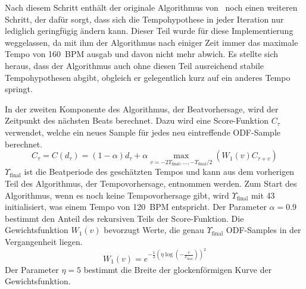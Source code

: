 {{{			%
			Nach diesem Schritt enthält der originale Algorithmus von~\cite{2009_DaPlSt} noch einen weiteren Schritt,
				der dafür sorgt,
				dass sich die Tempohypothese in jeder Iteration nur lediglich geringfügig ändern kann.
			Dieser Teil wurde für diese Implementierung weggelassen,
				da mit ihm der Algorithmus nach einiger Zeit immer das maximale Tempo von \SI{160}{\ac{BPM}} ausgab
				und davon nicht mehr abwich. 
			Es stellte sich heraus,
				dass der Algorithmus auch ohne diesen Teil ausreichend stabile Tempohypothesen abgibt,
				obgleich er gelegentlich kurz auf ein anderes Tempo springt.

			In der zweiten Komponente des Algorithmus,
				der Beatvorhersage,
				wird der Zeitpunkt des nächsten Beats berechnet.
			Dazu wird eine Score-Funktion $C_\tau$ verwendet,
				welche ein neues Sample für jedes neu eintreffende \ac{ODF}-Sample berechnet.
			\begin{equation}
				C_\tau = C(d_\tau) =
					(1 - \alpha)d_\tau +
					\alpha \max_{v = -2 \Upsilon_\text{final}, ..., -\Upsilon_\text{final} / 2}(W_1(v) C_{\tau + v})
				\label{eq:score_function}
			\end{equation}
			$\Upsilon_\text{final}$ ist die Beatperiode des geschätzten Tempos
				und kann aus dem vorherigen Teil des Algorithmus, der Tempovorhersage, entnommen werden.
			Zum Start des Algorithmus,
				wenn es noch keine Tempovorhersage gibt,
				wird $\Upsilon_\text{final}$ mit \num{43} initialisiert,
				was einem Tempo von \SI{120}{\ac{BPM}} entspricht.
			Der Parameter $\alpha = 0.9$ bestimmt den Anteil des rekursiven Teils der Score-Funktion.
			Die Gewichtsfunktion $W_1(v)$ bevorzugt Werte, die genau $\Upsilon_\text{final}$ \ac{ODF}-Samples in der Vergangenheit liegen.
			\begin{equation}
				W_1(v) = e^{-\frac{1}{2} \left( \eta \log \left( -\frac{v}{\Upsilon_\text{final}} \right) \right)^2}
			\end{equation}
			Der Parameter $\eta = 5$ bestimmt die Breite der glockenförmigen Kurve der Gewichtsfunktion.

}}}
